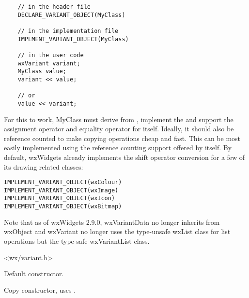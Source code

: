 \begin{verbatim}
    // in the header file
    DECLARE_VARIANT_OBJECT(MyClass)
    
    // in the implementation file
    IMPLMENT_VARIANT_OBJECT(MyClass)
    
    // in the user code
    wxVariant variant;
    MyClass value;
    variant << value;
    
    // or
    value << variant;
\end{verbatim}

For this to work, MyClass must derive from , implement
the 
and support the assignment operator and equality operator for itself. Ideally, it
should also be reference counted to make copying operations cheap and fast. This
can be most easily implemented using the reference counting support offered by
 itself. By default, wxWidgets already implements
the shift operator conversion for a few of its drawing related classes:

\begin{verbatim}
IMPLEMENT_VARIANT_OBJECT(wxColour)
IMPLEMENT_VARIANT_OBJECT(wxImage)
IMPLEMENT_VARIANT_OBJECT(wxIcon)
IMPLEMENT_VARIANT_OBJECT(wxBitmap)
\end{verbatim}

Note that as of wxWidgets 2.9.0, wxVariantData no longer inherits from wxObject
and wxVariant no longer uses the type-unsafe wxList class for list
operations but the type-safe wxVariantList class.




<wx/variant.h>






\label{wxvariantctor}


Default constructor.


Copy constructor, uses .

